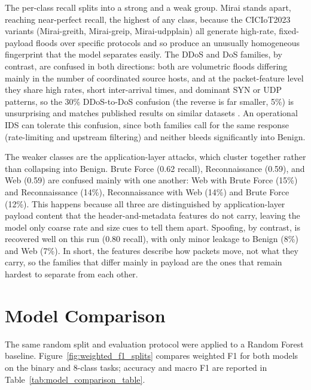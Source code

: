 \par The per-class recall splits into a strong and a weak group. Mirai stands apart, reaching near-perfect recall, the highest of any class, because the CICIoT2023 variants (Mirai-greith, Mirai-greip, Mirai-udpplain) all generate high-rate, fixed-payload floods over specific protocols and so produce an unusually homogeneous fingerprint that the model separates easily. The DDoS and DoS families, by contrast, are confused in both directions: both are volumetric floods differing mainly in the number of coordinated source hosts, and at the packet-feature level they share high rates, short inter-arrival times, and dominant SYN or UDP patterns, so the 30\% DDoS-to-DoS confusion (the reverse is far smaller, 5\%) is unsurprising and matches published results on similar datasets \cite{Lansky2021}. An operational IDS can tolerate this confusion, since both families call for the same response (rate-limiting and upstream filtering) and neither bleeds significantly into Benign.

\par The weaker classes are the application-layer attacks, which cluster together rather than collapsing into Benign. Brute Force (0.62 recall), Reconnaissance (0.59), and Web (0.59) are confused mainly with one another: Web with Brute Force (15\%) and Reconnaissance (14\%), Reconnaissance with Web (14\%) and Brute Force (12\%). This happens because all three are distinguished by application-layer payload content that the header-and-metadata features do not carry, leaving the model only coarse rate and size cues to tell them apart. Spoofing, by contrast, is recovered well on this run (0.80 recall), with only minor leakage to Benign (8\%) and Web (7\%). In short, the features describe how packets move, not what they carry, so the families that differ mainly in payload are the ones that remain hardest to separate from each other.

\section{Model Comparison}
\label{sec:model_comparison}

\par The same random split and evaluation protocol were applied to a Random Forest baseline. Figure~\ref{fig:weighted_f1_splits} compares weighted F1 for both models on the binary and 8-class tasks; accuracy and macro F1 are reported in Table~\ref{tab:model_comparison_table}.

